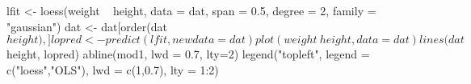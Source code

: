 \begin{Schunk}
\begin{Sinput}
 lfit <- loess(weight ~ height, data = dat, span = 0.5, degree = 2, family = "gaussian")
 dat <- dat[order(dat$height) ,]
 lopred <- predict(lfit, newdata = dat) 
 plot(weight ~ height, data = dat) 
 lines(dat$height, lopred)
 abline(mod1, lwd = 0.7, lty=2)
 legend("topleft", legend = c("loess","OLS"), lwd = c(1,0.7), lty = 1:2)
\end{Sinput}
\end{Schunk}
